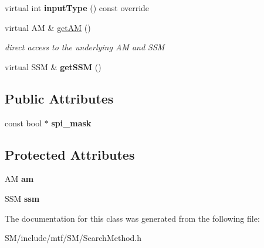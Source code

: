 \begin{DoxyCompactItemize}
\item 
\hypertarget{classSearchMethod_a58805e65e458ba34bf20221ab4976d19}{virtual int {\bfseries input\-Type} () const override}\label{classSearchMethod_a58805e65e458ba34bf20221ab4976d19}

\item 
\hypertarget{classSearchMethod_a2ec92eb64ac36e68e43c40712e77b8b0}{virtual A\-M \& \hyperlink{classSearchMethod_a2ec92eb64ac36e68e43c40712e77b8b0}{get\-A\-M} ()}\label{classSearchMethod_a2ec92eb64ac36e68e43c40712e77b8b0}

\begin{DoxyCompactList}\small\item\em direct access to the underlying A\-M and S\-S\-M \end{DoxyCompactList}\item 
\hypertarget{classSearchMethod_af0f4920bd2015c85990c4ba8f1a4ddf2}{virtual S\-S\-M \& {\bfseries get\-S\-S\-M} ()}\label{classSearchMethod_af0f4920bd2015c85990c4ba8f1a4ddf2}

\end{DoxyCompactItemize}
\subsection*{Public Attributes}
\begin{DoxyCompactItemize}
\item 
\hypertarget{classSearchMethod_a9871b3ad47acaa72f45833b0003bc9c9}{const bool $\ast$ {\bfseries spi\-\_\-mask}}\label{classSearchMethod_a9871b3ad47acaa72f45833b0003bc9c9}

\end{DoxyCompactItemize}
\subsection*{Protected Attributes}
\begin{DoxyCompactItemize}
\item 
\hypertarget{classSearchMethod_a25ab290d161ab7f991d13fab00b91899}{A\-M {\bfseries am}}\label{classSearchMethod_a25ab290d161ab7f991d13fab00b91899}

\item 
\hypertarget{classSearchMethod_a0ba3483aea5db5cadbf2a74e72414300}{S\-S\-M {\bfseries ssm}}\label{classSearchMethod_a0ba3483aea5db5cadbf2a74e72414300}

\end{DoxyCompactItemize}


The documentation for this class was generated from the following file\-:\begin{DoxyCompactItemize}
\item 
S\-M/include/mtf/\-S\-M/Search\-Method.\-h\end{DoxyCompactItemize}
